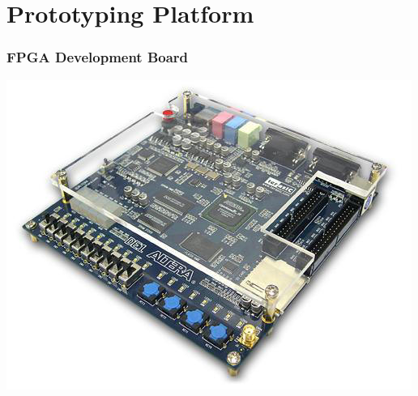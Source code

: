 \documentclass{beamer}
\begin{document}
\section{Prototyping Platform}
\begin{frame}
    \frametitle{FPGA Development Board}
    \begin{center}
        \includegraphics[height=0.7\textheight]{de1_angle.jpg}
    \end{center}
\end{frame}
\end{document}
